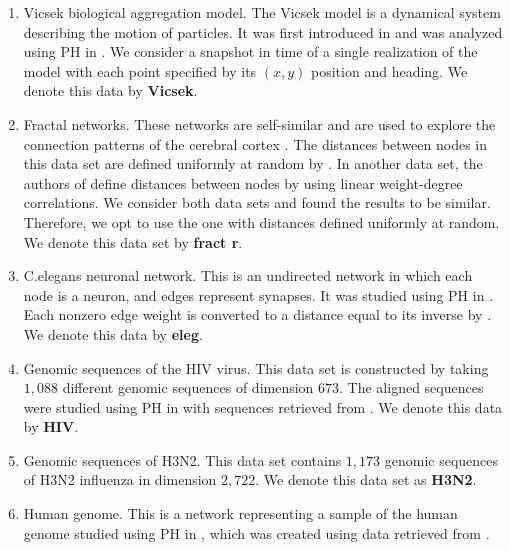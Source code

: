 \DIFaddend \begin{enumerate}
    \item Vicsek biological aggregation model. The Vicsek model is a dynamical system describing the motion of particles.  
    It was first introduced in \cite{vicsek} and was analyzed using PH in \cite{TZH15}. We consider a snapshot in time of a single realization of the model with each point specified by its $(x,y)$ position and heading. \DIFaddbegin {}\DIFaddend We denote this data by \textbf{Vicsek}.  
    \item Fractal networks. These networks are self-similar and are used to explore the connection patterns of the cerebral cortex \cite{fractr}. The distances between nodes in this data set are defined uniformly at random by \cite{roadmap2017}. In another data set, the authors of \cite{roadmap2017} define distances between nodes by using linear weight-degree correlations. We consider both data sets and found the results to be similar. Therefore, we opt to use the one with distances defined uniformly at random.  
    We denote this data set by \textbf{fract r}.  
    \item C.elegans neuronal network. This is an undirected network in which each node is a neuron, and edges represent synapses. It was studied using PH in \cite{celegans}. Each nonzero edge weight is converted to a distance equal to its inverse by \cite{roadmap2017}.  
    We denote this data by \textbf{eleg}. 
    \item Genomic sequences of the HIV virus. This data set is constructed by taking $1,088$ different genomic sequences of dimension $673$. The aligned sequences were studied using PH in \cite{hiv} with sequences retrieved from \cite{HIVdata}. \DIFaddbegin {}\DIFaddend We denote this data by \textbf{HIV}. 
    \item Genomic sequences of H3N2. This data set contains $1,173$ genomic sequences of H3N2 influenza in dimension $2,722$. \DIFaddbegin {}\DIFaddend We denote this data set as \textbf{H3N2}.   
    \item Human genome. This is a network representing a sample of the human genome studied using PH in \cite{celegans}, which was created using data retrieved from \cite{genome}. 

\end{enumerate}
